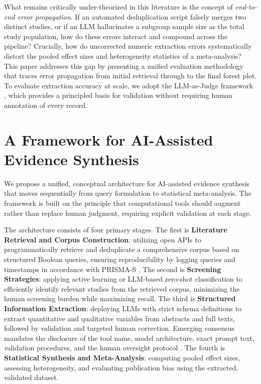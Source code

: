 \documentclass[12pt]{article}
\begin{document}
What remains critically under-theorized in this literature is the concept of \textit{end-to-end error propagation}. If an automated deduplication script falsely merges two distinct studies, or if an LLM hallucinates a subgroup sample size as the total study population, how do these errors interact and compound across the pipeline? Crucially, how do uncorrected numeric extraction errors systematically distort the pooled effect sizes and heterogeneity statistics of a meta-analysis? This paper addresses this gap by presenting a unified evaluation methodology that traces error propagation from initial retrieval through to the final forest plot. To evaluate extraction accuracy at scale, we adopt the LLM-as-Judge framework \cite{zheng2024llmjudge}, which provides a principled basis for validation without requiring human annotation of every record.

\section{A Framework for AI-Assisted Evidence Synthesis}

We propose a unified, conceptual architecture for AI-assisted evidence synthesis that moves sequentially from query formulation to statistical meta-analysis. The framework is built on the principle that computational tools should augment rather than replace human judgment, requiring explicit validation at each stage.

The architecture consists of four primary stages. The first is \textbf{Literature Retrieval and Corpus Construction}: utilizing open APIs to programmatically retrieve and deduplicate a comprehensive corpus based on structured Boolean queries, ensuring reproducibility by logging queries and timestamps in accordance with PRISMA-S \cite{rethlefsen2021prismas}. The second is \textbf{Screening Strategies}: applying active learning \cite{vandeschoot2021asreview} or LLM-based zero-shot classification to efficiently identify relevant studies from the retrieved corpus, minimizing the human screening burden while maximizing recall. The third is \textbf{Structured Information Extraction}: deploying LLMs with strict schema definitions to extract quantitative and qualitative variables from abstracts and full texts, followed by validation and targeted human correction. Emerging consensus mandates the disclosure of the tool name, model architecture, exact prompt text, validation procedures, and the human oversight protocol \cite{flemyng2025ai}. The fourth is \textbf{Statistical Synthesis and Meta-Analysis}: computing pooled effect sizes, assessing heterogeneity, and evaluating publication bias using the extracted, validated dataset. 
\end{document}

